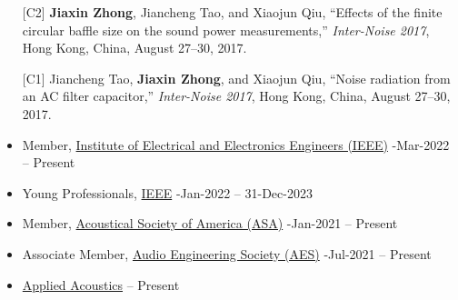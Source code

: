 \documentclass[10pt,a4paper,ragged2e,withhyper]{altacv}
\newcommand{\PubConference}[1]{\textit{#1}}
\newcommand{\PubTitle}[1]{``{#1,}''}
\newcommand{\PubMe}[1]{\textbf{#1}}
\newcommand{\hrefhl}[2]{{\color{accent}\href{#1}{#2}}}
\begin{document}
\begin{paracol}{1}
\begin{itemize}[leftmargin = 25pt]
    \item[{[C2]}] \PubMe{Jiaxin Zhong}, Jiancheng Tao, and Xiaojun Qiu,
        \PubTitle{Effects of the finite circular baffle size on the sound power measurements}
        \PubConference{Inter-Noise 2017},
        Hong Kong, China, 
        August 27--30, 2017.
        \href{https://github.com/JiaxinZhong/JiaxinZhong.github.io/raw/master/publications/conference/Zhong2017-InterNoise-Sound_power_measurement.pdf}{\color{accent}\faFilePdf[regular]}
    
    \item[{[C1]}] Jiancheng Tao, \PubMe{Jiaxin Zhong}, and Xiaojun Qiu,
        \PubTitle{Noise radiation from an AC filter capacitor}
        \PubConference{Inter-Noise 2017},
        Hong Kong, China, 
        August 27--30, 2017.
        \href{https://github.com/JiaxinZhong/JiaxinZhong.github.io/raw/master/publications/conference/Tao2017-Internoise-AC_capacitor.pdf}{\color{accent}\faFilePdf[regular]}
\end{itemize}



\begin{itemize}
    \item Member, \hrefhl{https://www.ieee.org/membership/index.html}{Institute of Electrical and Electronics Engineers (IEEE)} \hfill {}-Mar-2022 -- Present

    \item Young Professionals, \hrefhl{https://yp.ieee.org/}{IEEE} 
        \hfill {}-Jan-2022 -- 31-Dec-2023

    \item Member, \hrefhl{https://acousticalsociety.org/asa-membership/}{Acoustical Society of America (ASA)} 
        \hfill {}-Jan-2021 -- Present

    \item Associate Member, \hrefhl{https://aes2.org/aes-membership-overview/}{Audio Engineering Society (AES)} 
        \hfill {}-Jul-2021 -- Present
\end{itemize}

\begin{itemize}
    \item \hrefhl{https://www.journals.elsevier.com/applied-acoustics}{Applied Acoustics} \hfill {} -- Present


\end{itemize}
\end{paracol}
\end{document}
